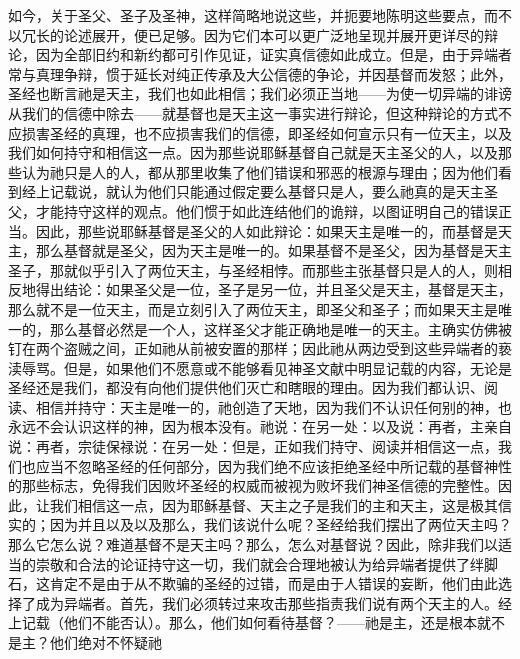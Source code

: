 如今，关于圣父、圣子及圣神，这样简略地说这些，并扼要地陈明这些要点，而不以冗长的论述展开，便已足够。因为它们本可以更广泛地呈现并展开更详尽的辩论，因为全部旧约和新约都可引作见证，证实真信德如此成立。但是，由于异端者常与真理争辩，惯于延长对纯正传承及大公信德的争论，并因基督而发怒；此外，圣经也断言祂是天主，我们也如此相信；我们必须正当地——为使一切异端的诽谤从我们的信德中除去——就基督也是天主这一事实进行辩论，但这种辩论的方式不应损害圣经的真理，也不应损害我们的信德，即圣经如何宣示只有一位天主，以及我们如何持守和相信这一点。因为那些说耶稣基督自己就是天主圣父的人，以及那些认为祂只是人的人，都从那里收集了他们错误和邪恶的根源与理由；因为他们看到经上记载说，就认为他们只能通过假定要么基督只是人，要么祂真的是天主圣父，才能持守这样的观点。他们惯于如此连结他们的诡辩，以图证明自己的错误正当。因此，那些说耶稣基督是圣父的人如此辩论：如果天主是唯一的，而基督是天主，那么基督就是圣父，因为天主是唯一的。如果基督不是圣父，因为基督是天主圣子，那就似乎引入了两位天主，与圣经相悖。而那些主张基督只是人的人，则相反地得出结论：如果圣父是一位，圣子是另一位，并且圣父是天主，基督是天主，那么就不是一位天主，而是立刻引入了两位天主，即圣父和圣子；而如果天主是唯一的，那么基督必然是一个人，这样圣父才能正确地是唯一的天主。主确实仿佛被钉在两个盗贼之间，正如祂从前被安置的那样；因此祂从两边受到这些异端者的亵渎辱骂。但是，如果他们不愿意或不能够看见神圣文献中明显记载的内容，无论是圣经还是我们，都没有向他们提供他们灭亡和瞎眼的理由。因为我们都认识、阅读、相信并持守：天主是唯一的，祂创造了天地，因为我们不认识任何别的神，也永远不会认识这样的神，因为根本没有。祂说：在另一处：以及说：再者，主亲自说：再者，宗徒保禄说：在另一处：但是，正如我们持守、阅读并相信这一点，我们也应当不忽略圣经的任何部分，因为我们绝不应该拒绝圣经中所记载的基督神性的那些标志，免得我们因败坏圣经的权威而被视为败坏我们神圣信德的完整性。因此，让我们相信这一点，因为耶稣基督、天主之子是我们的主和天主，这是极其信实的；因为并且以及以及那么，我们该说什么呢？圣经给我们摆出了两位天主吗？那么它怎么说？难道基督不是天主吗？那么，怎么对基督说？因此，除非我们以适当的崇敬和合法的论证持守这一切，我们就会合理地被认为给异端者提供了绊脚石，这肯定不是由于从不欺骗的圣经的过错，而是由于人错误的妄断，他们由此选择了成为异端者。首先，我们必须转过来攻击那些指责我们说有两个天主的人。经上记载（他们不能否认）。那么，他们如何看待基督？——祂是主，还是根本就不是主？他们绝对不怀疑祂